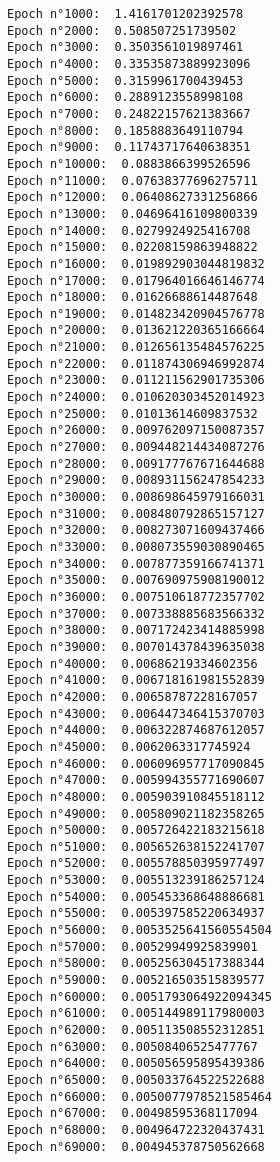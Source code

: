 \documentclass[11pt]{article}
\begin{document}
    \begin{Verbatim}[commandchars=\\\{\}]
Epoch n°1000:  1.4161701202392578
Epoch n°2000:  0.508507251739502
Epoch n°3000:  0.3503561019897461
Epoch n°4000:  0.33535873889923096
Epoch n°5000:  0.3159961700439453
Epoch n°6000:  0.2889123558998108
Epoch n°7000:  0.24822157621383667
Epoch n°8000:  0.1858883649110794
Epoch n°9000:  0.11743717640638351
Epoch n°10000:  0.0883866399526596
Epoch n°11000:  0.07638377696275711
Epoch n°12000:  0.06408627331256866
Epoch n°13000:  0.04696416109800339
Epoch n°14000:  0.0279924925416708
Epoch n°15000:  0.02208159863948822
Epoch n°16000:  0.019892903044819832
Epoch n°17000:  0.017964016646146774
Epoch n°18000:  0.01626688614487648
Epoch n°19000:  0.014823420904576778
Epoch n°20000:  0.013621220365166664
Epoch n°21000:  0.012656135484576225
Epoch n°22000:  0.011874306946992874
Epoch n°23000:  0.011211562901735306
Epoch n°24000:  0.010620303452014923
Epoch n°25000:  0.01013614609837532
Epoch n°26000:  0.009762097150087357
Epoch n°27000:  0.009448214434087276
Epoch n°28000:  0.009177767671644688
Epoch n°29000:  0.008931156247854233
Epoch n°30000:  0.008698645979166031
Epoch n°31000:  0.008480792865157127
Epoch n°32000:  0.008273071609437466
Epoch n°33000:  0.008073559030890465
Epoch n°34000:  0.007877359166741371
Epoch n°35000:  0.007690975908190012
Epoch n°36000:  0.007510618772357702
Epoch n°37000:  0.007338885683566332
Epoch n°38000:  0.007172423414885998
Epoch n°39000:  0.007014378439635038
Epoch n°40000:  0.00686219334602356
Epoch n°41000:  0.006718161981552839
Epoch n°42000:  0.00658787228167057
Epoch n°43000:  0.006447346415370703
Epoch n°44000:  0.006322874687612057
Epoch n°45000:  0.0062063317745924
Epoch n°46000:  0.006096957717090845
Epoch n°47000:  0.005994355771690607
Epoch n°48000:  0.005903910845518112
Epoch n°49000:  0.005809021182358265
Epoch n°50000:  0.005726422183215618
Epoch n°51000:  0.005652638152241707
Epoch n°52000:  0.005578850395977497
Epoch n°53000:  0.005513239186257124
Epoch n°54000:  0.005453368648886681
Epoch n°55000:  0.005397585220634937
Epoch n°56000:  0.0053525641560554504
Epoch n°57000:  0.00529949925839901
Epoch n°58000:  0.005256304517388344
Epoch n°59000:  0.005216503515839577
Epoch n°60000:  0.0051793064922094345
Epoch n°61000:  0.005144989117980003
Epoch n°62000:  0.005113508552312851
Epoch n°63000:  0.00508406525477767
Epoch n°64000:  0.005056595895439386
Epoch n°65000:  0.005033764522522688
Epoch n°66000:  0.0050077978521585464
Epoch n°67000:  0.00498595368117094
Epoch n°68000:  0.004964722320437431
Epoch n°69000:  0.004945378750562668

\end{Verbatim}
\end{document}
